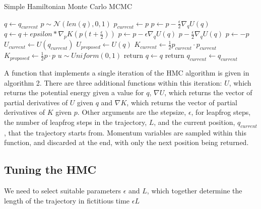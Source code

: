 \documentclass[]{report}
\begin{document}
\begin{algorithm}
	\label{alg:simpHMC}
	\caption{Simple Hamiltonian Monte Carlo MCMC}
	\begin{algorithmic}[1]
		\State $ q \gets q_{current}$
		\State $ p \sim \mathcal{N}(len(q),0,1)$
		\State $ p_{current} \gets p$
		\State $ p \gets p - \frac{\epsilon}{2}\nabla_{q} U(q)$  
		\State $q \gets q + epsilon * \nabla_{p} K (p(t + \frac{\epsilon}{2}))$  
		\State $p \gets p- \epsilon \nabla_{q} U(q)$
		\EndIf
		\EndFor
		\State $p - \frac{\epsilon}{2}\nabla_{q} U(q)$ 
		\State $p \gets - p$ 
		\State $U_{current} \gets U(q_{current})$
		\State $U_{proposed} \gets U(q)$
		\State $K_{current} \gets \frac{1}{2} p_{current} \cdot p_{current} $
		\State $K_{proposed} \gets \frac{1}{2} p \cdot p$
		\State $ u \sim Uniform(0,1)$
		\State $\text{return } q \gets q$ 
		\Else
		\State $\text{return } q_{current} \gets q_{current}$ 
		\EndIf
	\end{algorithmic} 
\end{algorithm}
A function that implements a single iteration of the HMC algorithm is given in algorithm 2. There are three additional functions within this iteration: $U$, which returns the potential energy given a value for $q$,  $\nabla U$, which returns the vector of partial derivatives of $U$ given $q$ and $\nabla K$, which returns the vector of partial derivatives of $K$ given $p$. Other arguments are the stepsize, $\epsilon$, for leapfrog steps, the number of leapfrog steps in the trajectory, $L$, and the current position, $q_{current}$, that the trajectory starts from. Momentum variables are sampled within this function, and discarded at the end, with only the next position being returned. 

\subsection{Tuning the HMC}

We need to select suitable parameters $\epsilon$ and $L$, which together determine the length of the trajectory in fictitious time $\epsilon L$  
\end{document}
